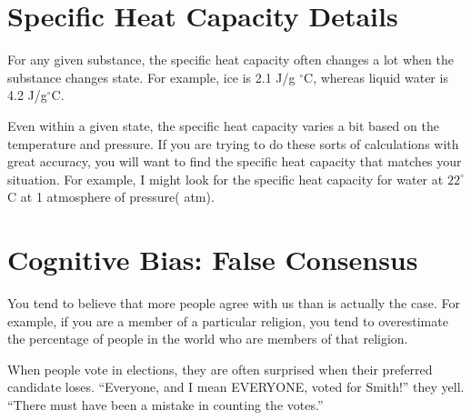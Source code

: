\section{Specific Heat Capacity Details}

For any given substance, the specific heat capacity often changes a
lot when the substance changes state. For example, ice is 2.1 J/g
$^\circ$C, whereas liquid water is 4.2 J/g$^\circ$C.

Even within a given state, the specific heat capacity varies a bit
based on the temperature and pressure. If you are trying to do these
sorts of calculations with great accuracy, you will want to find the
specific heat capacity that matches your situation. For example, I
might look for the specific heat capacity for water at $22^\circ$C at
1 atmosphere of pressure( atm).

\section{Cognitive Bias: False Consensus}

You tend to believe that more people agree with us than is actually
the case. For example, if you are a member of a particular religion,
you tend to overestimate the percentage of people in the world who are
members of that religion.

When people vote in elections, they are often surprised when their
preferred candidate loses. ``Everyone, and I mean EVERYONE, voted for
Smith!'' they yell.  ``There must have been a mistake in counting the
votes.''

